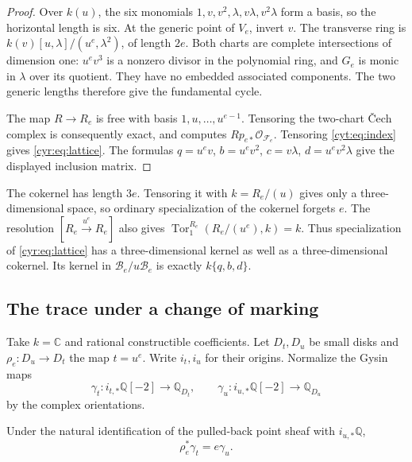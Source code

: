 \begin{proof}
Over \(k(u)\), the six monomials
\(1,v,v^2,\lambda,v\lambda,v^2\lambda\) form a basis,
so the horizontal length is six.
At the generic point of \(V_e\), invert \(v\).
The transverse ring is
\(k(v)[u,\lambda]/(u^e,\lambda^2)\), of length \(2e\).
Both charts are complete intersections of dimension one:
\(u^ev^3\) is a nonzero divisor in the polynomial ring,
and \(G_e\) is monic in \(\lambda\) over its quotient.
They have no embedded associated components. The two
generic lengths therefore give the fundamental cycle.

The map \(R\to R_e\) is free with basis
\(1,u,\ldots,u^{e-1}\). Tensoring the two-chart
\v Cech complex is consequently exact, and computes
\(Rp_{e*}\mathcal O_{\mathscr F_e}\).
Tensoring \eqref{cyt:eq:index} gives
\eqref{cyr:eq:lattice}. The formulas
\(q=u^ev\), \(b=u^ev^2\), \(c=v\lambda\),
\(d=u^ev^2\lambda\) give the displayed inclusion matrix.
\end{proof}

The cokernel has length \(3e\). Tensoring it with
\(k=R_e/(u)\) gives only a three-dimensional space, so
ordinary specialization of the cokernel forgets \(e\).
The resolution \([R_e\xrightarrow{u^e}R_e]\) also gives
\(\operatorname{Tor}_1^{R_e}(R_e/(u^e),k)=k\).
Thus specialization of \eqref{cyr:eq:lattice} has a
three-dimensional kernel as well as a three-dimensional
cokernel. Its kernel in \(\mathcal B_e/u\mathcal B_e\)
is exactly \(k\{q,b,d\}\).

\subsection{The trace under a change of marking}

Take \(k=\mathbb C\) and rational constructible coefficients.
Let \(D_t,D_u\) be small disks and
\(\rho_e:D_u\to D_t\) the map \(t=u^e\).
Write \(i_t,i_u\) for their origins. Normalize the Gysin maps
\[
 \gamma_t:i_{t,*}\mathbb Q[-2]\to\mathbb Q_{D_t},\qquad
 \gamma_u:i_{u,*}\mathbb Q[-2]\to\mathbb Q_{D_u}
\]
by the complex orientations.

\begin{lemma}\label{cyr:lem:gysin}
Under the natural identification of the pulled-back point
sheaf with \(i_{u,*}\mathbb Q\),
\begin{equation}\label{cyr:eq:gysin}
                         \rho_e^*\gamma_t=e\gamma_u.
\end{equation}
\end{lemma}

